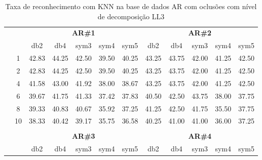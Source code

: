 \begin{table}[H]
	\centering
    \normalsize
	\caption{Taxa de reconhecimento com KNN na base de dados AR com oclusões com nível de decomposição LL3}
	\begin{tabular}{|c|c|c c c c c|c c c c c|}
\cline{3-12}
\multicolumn{2}{c|}{\multirow{2}{*}{}} & \multicolumn{5}{c|}{\textbf{AR\#1}}  & \multicolumn{5}{c|}{\textbf{AR\#2}} \\\cline{3-12}

\multicolumn{2}{c|}{}  & db2 & db4 & sym3 & sym4 & sym5 & db2 & db4& sym3 & sym4 & sym5 \\\hline

\multicolumn{1}{|c|}{ \multirow{5}{*}{\rotatebox[origin=c]{90}{\textbf{K-vizinhos}}} }
& 1 &	42.83 &	44.25 &	42.50 &	39.50 &	40.25 & 43.25	& 43.75	& 42.00	& 41.25	& 42.50 \\\cline{2-12}
& 2 &	42.83 &	44.25 &	42.50 &	39.50 &	40.25 & 43.25	& 43.75	& 42.00	& 41.25	& 42.50 \\\cline{2-12}
& 4 &	41.58 &	43.00 &	41.92 &	38.00 &	38.67 & 43.25	& 43.75	& 42.00	& 41.25	& 42.50 \\\cline{2-12}
& 6 &	39.67 &	41.75 &	41.33 &	37.42 &	37.83 & 40.50	& 42.50	& 43.75	& 38.00	& 37.75 \\\cline{2-12}
& 8 &	39.33 &	40.83 &	40.67 &	35.92 &	37.25 & 41.25	& 42.50	& 41.75	& 35.50	& 37.75 \\\cline{2-12}
& 10&   38.33 &	40.42 &	39.17 &	35.75 &	36.58 & 40.25	& 41.00	& 41.00	& 36.00	& 37.25 \\\midrule
\multicolumn{12}{c}{}\\ 




\cline{3-12}
\multicolumn{2}{c}{} & \multicolumn{5}{|c|}{\textbf{AR\#3}}  & \multicolumn{5}{c|}{\textbf{AR\#4}} \\\cline{3-12}
\multicolumn{2}{c}{}  & \multicolumn{1}{|c}{db2} & db4 & sym3 & sym4 & sym5 & db2 & db4& sym3 & sym4 & sym5 \\\hline


\end{tabular}
\end{table}
